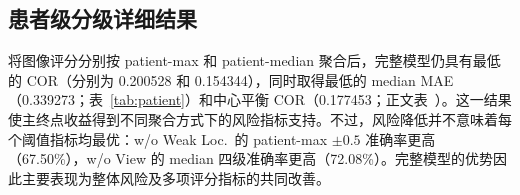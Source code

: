\subsection{患者级分级详细结果}\label{sec:appendix-patient}
将图像评分分别按 patient-max 和 patient-median 聚合后，完整模型仍具有最低的 COR（分别为 0.200528 和 0.154344），同时取得最低的 median MAE（0.339273；表~\ref{tab:patient}）和中心平衡 COR（0.177453；正文表~）。这一结果使主终点收益得到不同聚合方式下的风险指标支持。不过，风险降低并不意味着每个阈值指标均最优：w/o Weak Loc.\ 的 patient-max $\pm0.5$ 准确率更高（67.50\%），w/o View 的 median 四级准确率更高（72.08\%）。完整模型的优势因此主要表现为整体风险及多项评分指标的共同改善。

